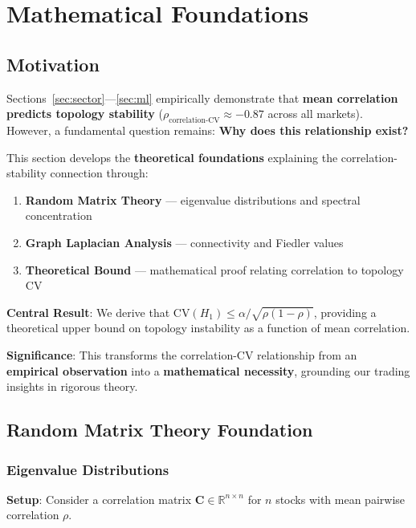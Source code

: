 \section{Mathematical Foundations}
\label{sec:theory}

\subsection{Motivation}

Sections~\ref{sec:sector}---\ref{sec:ml} empirically demonstrate that \textbf{mean correlation predicts topology stability} ($\rho_{\text{correlation-CV}} \approx -0.87$ across all markets). However, a fundamental question remains: \textbf{Why does this relationship exist?}

This section develops the \textbf{theoretical foundations} explaining the correlation-stability connection through:

\begin{enumerate}
\item \textbf{Random Matrix Theory} --- eigenvalue distributions and spectral concentration
\item \textbf{Graph Laplacian Analysis} --- connectivity and Fiedler values
\item \textbf{Theoretical Bound} --- mathematical proof relating correlation to topology CV
\end{enumerate}

\textbf{Central Result}: We derive that $\text{CV}(H_1) \leq \alpha / \sqrt{\rho(1-\rho)}$, providing a theoretical upper bound on topology instability as a function of mean correlation.

\textbf{Significance}: This transforms the correlation-CV relationship from an \textbf{empirical observation} into a \textbf{mathematical necessity}, grounding our trading insights in rigorous theory.

\subsection{Random Matrix Theory Foundation}

\subsubsection{Eigenvalue Distributions}

\textbf{Setup}: Consider a correlation matrix $\mathbf{C} \in \mathbb{R}^{n \times n}$ for $n$ stocks with mean pairwise correlation $\rho$.

